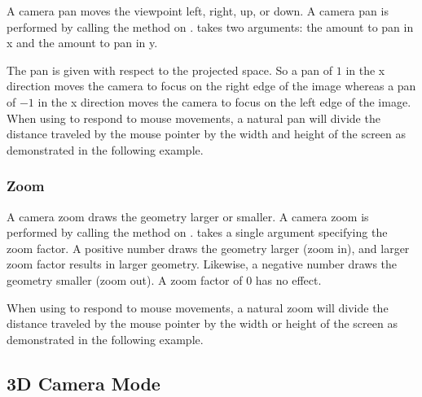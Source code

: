 
A camera pan moves the viewpoint left, right, up, or down. A camera pan is
performed by calling the  method on .
 takes two arguments: the amount to pan in x and the amount
to pan in y.

The pan is given with respect to the projected space. So a pan of $1$ in
the x direction moves the camera to focus on the right edge of the image
whereas a pan of $-1$ in the x direction moves the camera to focus on the
left edge of the image. When using  to respond to mouse
movements, a natural pan will divide the distance traveled by the mouse
pointer by the width and height of the screen as demonstrated in the
following example.



\subsubsection{Zoom}


A camera zoom draws the geometry larger or smaller. A camera zoom is
performed by calling the  method on .
 takes a single argument specifying the zoom factor. A
positive number draws the geometry larger (zoom in), and larger zoom factor
results in larger geometry. Likewise, a negative number draws the geometry
smaller (zoom out). A zoom factor of 0 has no effect.

When using  to respond to mouse movements, a natural zoom
will divide the distance traveled by the mouse pointer by the width or
height of the screen as demonstrated in the following example.




\subsection{3D Camera Mode}

